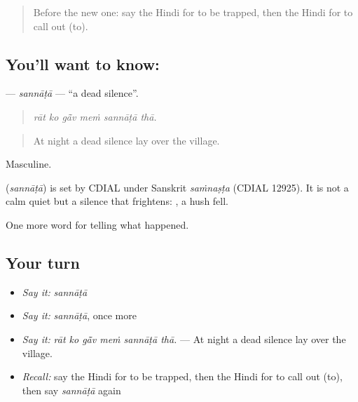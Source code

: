 \label{lesson:HI-C307-sannata}



\begin{quote}
Before the new one: say the Hindi for to be trapped, then the Hindi for to call out (to).
\end{quote}

\subsection*{You'll want to know: }
\textbf{} — \emph{sannāṭā} — \textquotedblleft{}a dead silence\textquotedblright{}.

\begin{quote}
     
\end{quote}

\begin{quote}
\emph{rāt ko gā̃v meṁ sannāṭā thā.}
\end{quote}

\begin{quote}
At night a dead silence lay over the village.
\end{quote}

Masculine.

\begin{cousinweb}
\textbf{} (\emph{sannāṭā}) is set by CDIAL under Sanskrit \emph{saṁnaṣṭa} (CDIAL 12925). It is not a calm quiet but a silence that frightens: \textbf{  }, a hush fell.
\end{cousinweb}

\begin{grammarlens}[title={What you've built}]
One more word for telling what happened.
\end{grammarlens}

\subsection*{Your turn}
\begin{itemize}
\raggedright
  \item \emph{Say it:} \emph{sannāṭā}
  \item \emph{Say it:} \emph{sannāṭā}, once more
  \item \emph{Say it:} \emph{rāt ko gā̃v meṁ sannāṭā thā.} — At night a dead silence lay over the village.
  \item \emph{Recall:} say the Hindi for to be trapped, then the Hindi for to call out (to), then say \emph{sannāṭā} again
\end{itemize}

